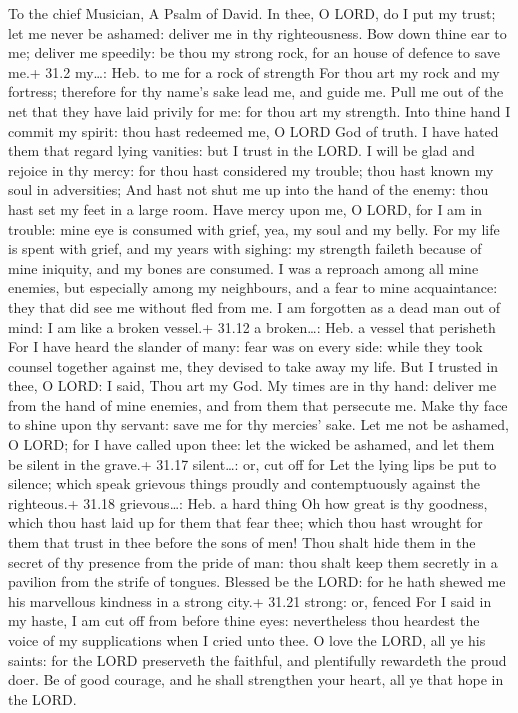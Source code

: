 To the chief Musician, A Psalm of David.  In thee, O LORD,
do I put my trust; let me never be ashamed: deliver me in thy
righteousness.  Bow down thine ear to me; deliver me
speedily: be thou my strong rock, for an house of defence to save me.+
31.2 my\ldots: Heb. to me for a rock of strength  For thou
art my rock and my fortress; therefore for thy name's sake lead me, and
guide me.  Pull me out of the net that they have laid
privily for me: for thou art my strength.  Into thine hand I
commit my spirit: thou hast redeemed me, O LORD God of truth.
 I have hated them that regard lying vanities: but I trust
in the LORD.  I will be glad and rejoice in thy mercy: for
thou hast considered my trouble; thou hast known my soul in adversities;
 And hast not shut me up into the hand of the enemy: thou
hast set my feet in a large room.  Have mercy upon me, O
LORD, for I am in trouble: mine eye is consumed with grief, yea, my soul
and my belly.  For my life is spent with grief, and my
years with sighing: my strength faileth because of mine iniquity, and my
bones are consumed.  I was a reproach among all mine
enemies, but especially among my neighbours, and a fear to mine
acquaintance: they that did see me without fled from me.  I
am forgotten as a dead man out of mind: I am like a broken vessel.+
31.12 a broken\ldots: Heb. a vessel that perisheth  For I
have heard the slander of many: fear was on every side: while they took
counsel together against me, they devised to take away my life.
 But I trusted in thee, O LORD: I said, Thou art my God.
 My times are in thy hand: deliver me from the hand of mine
enemies, and from them that persecute me.  Make thy face to
shine upon thy servant: save me for thy mercies' sake.  Let
me not be ashamed, O LORD; for I have called upon thee: let the wicked
be ashamed, and let them be silent in the grave.+ 31.17 silent\ldots:
or, cut off for  Let the lying lips be put to silence;
which speak grievous things proudly and contemptuously against the
righteous.+ 31.18 grievous\ldots: Heb. a hard thing  Oh how
great is thy goodness, which thou hast laid up for them that fear thee;
which thou hast wrought for them that trust in thee before the sons of
men!  Thou shalt hide them in the secret of thy presence
from the pride of man: thou shalt keep them secretly in a pavilion from
the strife of tongues.  Blessed be the LORD: for he hath
shewed me his marvellous kindness in a strong city.+ 31.21 strong: or,
fenced  For I said in my haste, I am cut off from before
thine eyes: nevertheless thou heardest the voice of my supplications
when I cried unto thee.  O love the LORD, all ye his
saints: for the LORD preserveth the faithful, and plentifully rewardeth
the proud doer.  Be of good courage, and he shall
strengthen your heart, all ye that hope in the LORD.

